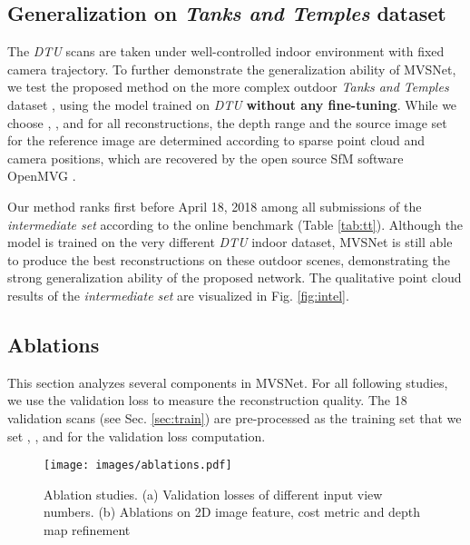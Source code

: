 \documentclass[runningheads]{llncs}
\begin{document}
\subsection{Generalization on \textit{Tanks and Temples} dataset} \label{sec:tt}

The \textit{DTU} scans are taken under well-controlled indoor environment with fixed camera trajectory. To further demonstrate the generalization ability of MVSNet, we test the proposed method on the more complex outdoor \textit{Tanks and Temples} dataset \cite{knapitsch2017tanks}, using the model trained on \textit{DTU} \textbf{without any fine-tuning}. While we choose , ,  and  for all reconstructions, the depth range and the source image set for the reference image are determined according to sparse point cloud and camera positions, which are recovered by the open source SfM software OpenMVG \cite{openMVG}.



Our method ranks first before April 18, 2018 among all submissions of the \textit{intermediate set} \cite{knapitsch2017tanks} according to the online benchmark (Table \ref{tab:tt}). Although the model is trained on the very different \textit{DTU} indoor dataset, MVSNet is still able to produce the best reconstructions on these outdoor scenes, demonstrating the strong generalization ability of the proposed network. The qualitative point cloud results of the \textit{intermediate set} are visualized in Fig. \ref{fig:intel}.  



\subsection{Ablations} \label{sec:ablations}

This section analyzes several components in MVSNet. For all following studies, we use the validation loss to measure the reconstruction quality. The 18 validation scans (see Sec. \ref{sec:train}) are pre-processed as the training set that we set , ,  and  for the validation loss computation. 

\begin{figure}[!t]
  \centering
  \texttt{[image: images/ablations.pdf]}
  \caption{Ablation studies. (a) Validation losses of different input view numbers. (b) Ablations on 2D image feature, cost metric and depth map refinement
  }
  \label{fig:ablations}
\end{figure}
\end{document}

